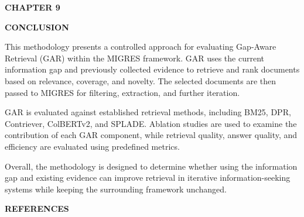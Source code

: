 \documentclass[12pt,a4paper]{report}
\newcommand{\fronttitle}[1]{
    \begin{center}
        {\fontsize{18}{21}\selectfont\bfseries #1\par}
    \end{center}
    \vspace{0.12in}
}
\newcommand{\chaptertitle}[2]{
    \begin{center}
        {\fontsize{18}{21}\selectfont\bfseries CHAPTER #1\par}
        \vspace{0.10in}
        {\fontsize{18}{21}\selectfont\bfseries #2\par}
    \end{center}
    \vspace{0.12in}
}
\begin{document}


\chaptertitle{9}{CONCLUSION}

\justifying

This methodology presents a controlled approach for evaluating Gap-Aware Retrieval (GAR) within the MIGRES framework. GAR uses the current information gap and previously collected evidence to retrieve and rank documents based on relevance, coverage, and novelty. The selected documents are then passed to MIGRES for filtering, extraction, and further iteration.

GAR is evaluated against established retrieval methods, including BM25, DPR, Contriever, ColBERTv2, and SPLADE. Ablation studies are used to examine the contribution of each GAR component, while retrieval quality, answer quality, and efficiency are evaluated using predefined metrics.

Overall, the methodology is designed to determine whether using the information gap and existing evidence can improve retrieval in iterative information-seeking systems while keeping the surrounding framework unchanged.

\clearpage



\fronttitle{REFERENCES}

\renewcommand{\bibname}{}



\end{document}
